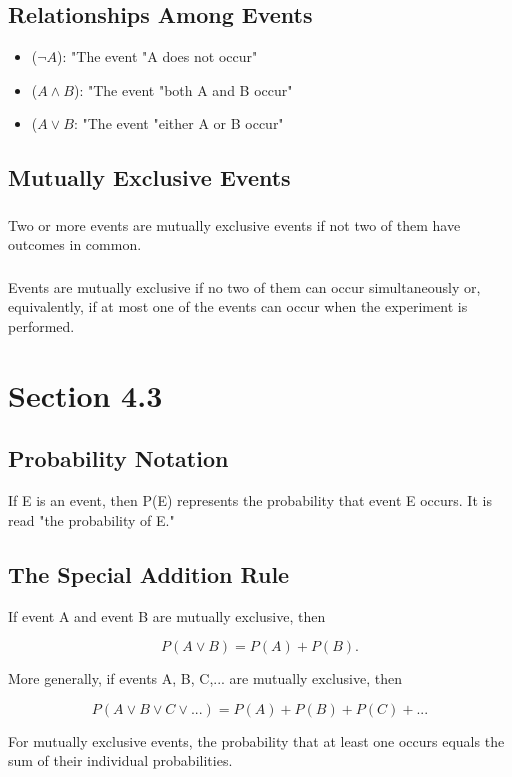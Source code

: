\documentclass[12pt]{article}
\begin{document}
        \subsection*{Relationships Among Events}
            \begin{itemize}
                \item (\(\neg A\)): "The event "A does not occur"
                \item (\(A \wedge B\)): "The event "both A and B occur"
                \item (\(A \vee B\): "The event "either A or B occur"
            \end{itemize}
        \subsection*{Mutually Exclusive Events}
            \subsubsection*{}    
               Two or more events are mutually exclusive events if not two of them have outcomes in common.
            \subsubsection*{}
               Events are mutually exclusive if no two of them can occur simultaneously or, equivalently, if at most one of the events can occur when the experiment is performed.
    \section*{Section 4.3}
        \subsection*{Probability Notation}
            If E is an event, then P(E) represents the probability that event E occurs. It is read "the probability of E."
        \subsection*{The Special Addition Rule}
            If event A and event B are mutually exclusive, then
            \begin{center}
                \[
                    P(A \vee B) = P(A)  + P(B).  
                \]
            \end{center}
            More generally, if events A, B, C,... are mutually exclusive, then
            \begin{center}
                \[
                    P(A \vee B \vee C \vee ...) = P(A) + P(B) + P(C) +...    
                \]                
            \end{center}
            For mutually exclusive events, the probability that at least one occurs equals the sum of their individual probabilities.
\end{document}
